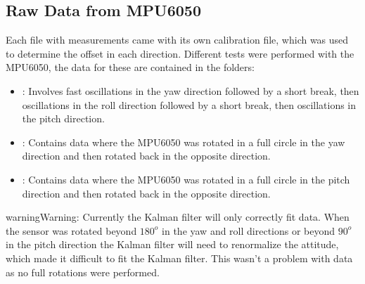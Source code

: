 \documentclass[letterpaper,10pt,english]{jupyterBook}
\begin{document}
\subsection{Raw Data from MPU6050}
\label{\detokenize{7RealData:raw-data-from-mpu6050}}
\sphinxAtStartPar
Each file with measurements came with its own calibration file, which was used to determine the offset in each direction. Different tests were performed with the MPU6050, the data for these are contained in the folders:
\begin{itemize}
\item {} 
\sphinxAtStartPar
{}: Involves fast oscillations in the yaw direction followed by a short break, then oscillations in the roll direction followed by a short break, then oscillations in the pitch direction.

\item {} 
\sphinxAtStartPar
{}: Contains data where the MPU6050 was rotated in a full circle in the yaw direction and then rotated back in the opposite direction.

\item {} 
\sphinxAtStartPar
{}: Contains data where the MPU6050 was rotated in a full circle in the pitch direction and then rotated back in the opposite direction.

\end{itemize}

\begin{sphinxadmonition}{warning}{Warning:}
\sphinxAtStartPar
Currently the Kalman filter will only correctly fit  data. When the sensor was rotated beyond \(180^o\) in the yaw and roll directions or beyond \(90^o\) in the pitch direction the Kalman filter will need to re\sphinxhyphen{}normalize the attitude, which made it difficult to fit the Kalman filter. This wasn’t a problem with  data as no full rotations were performed.
\end{sphinxadmonition}
\end{document}
